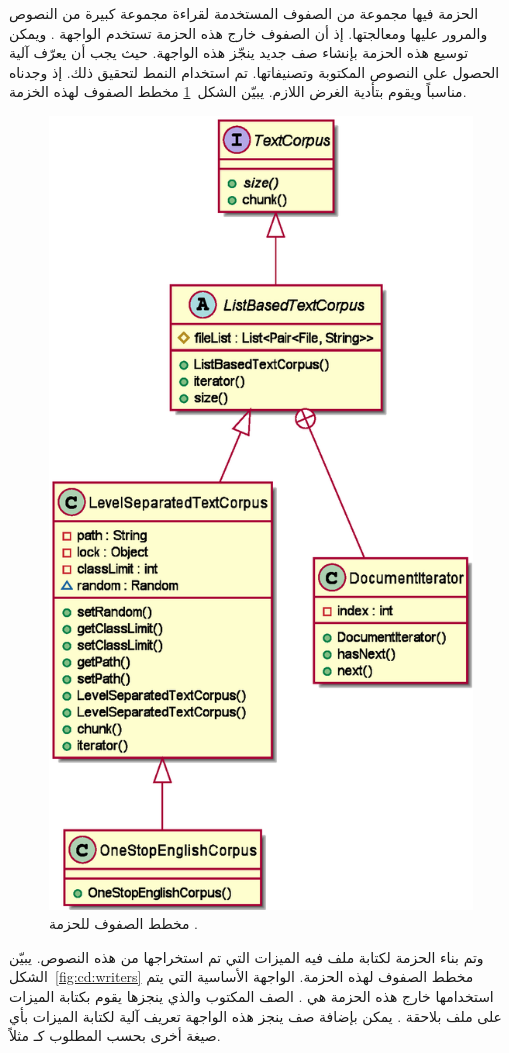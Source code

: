 الحزمة  فيها مجموعة من الصفوف المستخدمة لقراءة مجموعة كبيرة من النصوص والمرور عليها ومعالجتها.
إذ أن الصفوف خارج هذه الحزمة تستخدم الواجهة .
ويمكن توسيع هذه الحزمة بإنشاء صف جديد ينجّز هذه الواجهة.
حيث يجب أن يعرّف آلية الحصول على النصوص المكتوبة وتصنيفاتها.
تم استخدام النمط  لتحقيق ذلك.
إذ وجدناه مناسباً ويقوم بتأدية الغرض اللازم.
يبيّن الشكل~\ref{fig:cd:corpora} مخطط الصفوف لهذه الخزمة.

\begin{figure}[htb]
	\centering
	\includegraphics[width=0.6\linewidth]{images/cd-corpora.eps}
	\caption{%
		مخطط الصفوف للحزمة .
	}
	\label{fig:cd:corpora}
\end{figure}

وتم بناء الحزمة  لكتابة ملف فيه الميزات التي تم استخراجها من هذه النصوص.
يبيّن الشكل~\ref{fig:cd:writers} مخطط الصفوف لهذه الحزمة.
الواجهة الأساسية التي يتم استخدامها خارج هذه الحزمة هي .
الصف المكتوب والذي ينجزها يقوم بكتابة الميزات على ملف بلاحقة .
يمكن بإضافة صف ينجز هذه الواجهة تعريف آلية لكتابة الميزات بأي صيغة أخرى بحسب المطلوب كـ  مثلاً.

